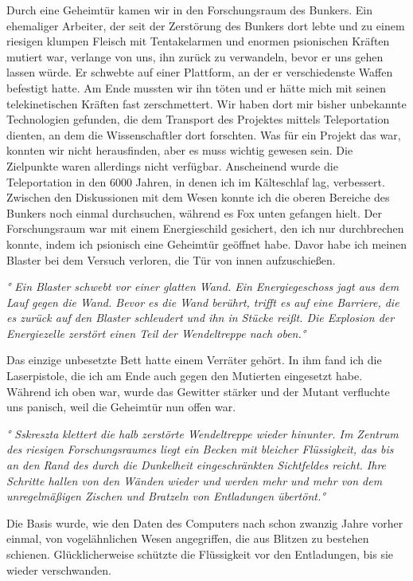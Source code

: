 \documentclass[11pt]{article}
\begin{document}
Durch eine Geheimtür kamen wir in den Forschungsraum des Bunkers. Ein
ehemaliger Arbeiter, der seit der Zerstörung des Bunkers dort lebte und
zu einem riesigen klumpen Fleisch mit Tentakelarmen und enormen
psionischen Kräften mutiert war, verlange von uns, ihn zurück zu
verwandeln, bevor er uns gehen lassen würde. Er schwebte auf einer
Plattform, an der er verschiedenste Waffen befestigt hatte. Am Ende
mussten wir ihn töten und er hätte mich mit seinen telekinetischen
Kräften fast zerschmettert. Wir haben dort mir bisher unbekannte
Technologien gefunden, die dem Transport des Projektes mittels
Teleportation dienten, an dem die Wissenschaftler dort forschten. Was
für ein Projekt das war, konnten wir nicht herausfinden, aber es muss
wichtig gewesen sein. Die Zielpunkte waren allerdings nicht verfügbar.
Anscheinend wurde die Teleportation in den 6000 Jahren, in denen ich im
Kälteschlaf lag, verbessert.\\ Zwischen den Diskussionen mit dem Wesen
konnte ich die oberen Bereiche des Bunkers noch einmal durchsuchen,
während es Fox unten gefangen hielt. Der Forschungsraum war mit einem
Energieschild gesichert, den ich nur durchbrechen konnte, indem ich
psionisch eine Geheimtür geöffnet habe. Davor habe ich meinen Blaster
bei dem Versuch verloren, die Tür von innen aufzuschießen.

\emph{° Ein Blaster schwebt vor einer glatten Wand. Ein Energiegeschoss
jagt aus dem Lauf gegen die Wand. Bevor es die Wand berührt, trifft es
auf eine Barriere, die es zurück auf den Blaster schleudert und ihn in
Stücke reißt. Die Explosion der Energiezelle zerstört einen Teil der
Wendeltreppe nach oben.°}

Das einzige unbesetzte Bett hatte einem Verräter gehört. In ihm fand ich
die Laserpistole, die ich am Ende auch gegen den Mutierten eingesetzt
habe. Während ich oben war, wurde das Gewitter stärker und der Mutant
verfluchte uns panisch, weil die Geheimtür nun offen war.

\emph{° Sskreszta klettert die halb zerstörte Wendeltreppe wieder
hinunter. Im Zentrum des riesigen Forschungsraumes liegt ein Becken mit
bleicher Flüssigkeit, das bis an den Rand des durch die Dunkelheit
eingeschränkten Sichtfeldes reicht. Ihre Schritte hallen von den Wänden
wieder und werden mehr und mehr von dem unregelmäßigen Zischen und
Bratzeln von Entladungen übertönt.°}

Die Basis wurde, wie den Daten des Computers nach schon zwanzig Jahre
vorher einmal, von vogelähnlichen Wesen angegriffen, die aus Blitzen zu
bestehen schienen. Glücklicherweise schützte die Flüssigkeit vor den
Entladungen, bis sie wieder verschwanden.
\end{document}
